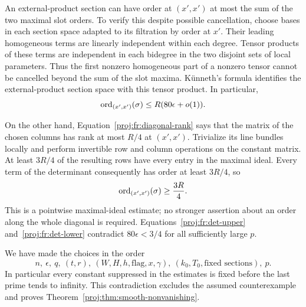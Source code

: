 An external-product section can have order at \((x',x')\) at most
the sum of the two maximal slot orders. To verify this despite
possible cancellation, choose bases in each section space adapted to
its filtration by order at \(x'\). Their leading homogeneous terms
are linearly independent within each degree. Tensor products of
these terms are independent in each bidegree in the two disjoint
sets of local parameters. Thus the first nonzero homogeneous part
of a nonzero tensor cannot be cancelled beyond the sum of the slot
maxima. K\"unneth's formula identifies the external-product section
space with this tensor product. In particular,
\begin{equation}
\label{proj:fr:det-upper}
 \operatorname{ord}_{(x',x')}(\sigma)\leq R(80\epsilon+o(1)).
\end{equation}

On the other hand, Equation~\eqref{proj:fr:diagonal-rank} says that the
matrix of the chosen columns has rank at most \(R/4\) at \((x',x')\).
Trivialize its line bundles locally and perform invertible row and
column operations on the constant matrix. At least \(3R/4\) of the
resulting rows have every entry in the maximal ideal. Every term
of the determinant consequently has order at least \(3R/4\), so
\begin{equation}
\label{proj:fr:det-lower}
 \operatorname{ord}_{(x',x')}(\sigma)\geq\frac{3R}{4}.
\end{equation}
This is a pointwise maximal-ideal estimate; no stronger assertion
about an order along the whole diagonal is required.
Equations~\eqref{proj:fr:det-upper} and~\eqref{proj:fr:det-lower} contradict
\(80\epsilon<3/4\) for all sufficiently large \(p\).

We have made the choices in the order
\[
 n,\ \epsilon,\ q,\ (t,r),\
 (W,H,h,\text{flag},x,\gamma),\
 (k_0,T_0,\text{fixed sections}),\ p.
\]
In particular every constant suppressed in the estimates is fixed
before the last prime tends to infinity. This contradiction excludes
the assumed counterexample and proves
Theorem~\ref{proj:thm:smooth-nonvanishing}.
